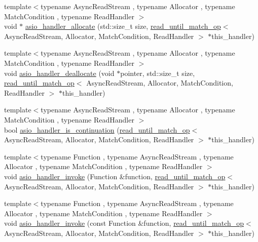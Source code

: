 \begin{DoxyCompactItemize}
\item 
{\footnotesize template$<$typename Async\+Read\+Stream , typename Allocator , typename Match\+Condition , typename Read\+Handler $>$ }\\void $\ast$ \hyperlink{namespaceasio_1_1detail_a5b22dd43113d0638c0d75b2701fc0d74}{asio\+\_\+handler\+\_\+allocate} (std\+::size\+\_\+t size, \hyperlink{classasio_1_1detail_1_1read__until__match__op}{read\+\_\+until\+\_\+match\+\_\+op}$<$ Async\+Read\+Stream, Allocator, Match\+Condition, Read\+Handler $>$ $\ast$this\+\_\+handler)
\item 
{\footnotesize template$<$typename Async\+Read\+Stream , typename Allocator , typename Match\+Condition , typename Read\+Handler $>$ }\\void \hyperlink{namespaceasio_1_1detail_a7ca75a364c4ff9e7eaa3bbabf5224dcf}{asio\+\_\+handler\+\_\+deallocate} (void $\ast$pointer, std\+::size\+\_\+t size, \hyperlink{classasio_1_1detail_1_1read__until__match__op}{read\+\_\+until\+\_\+match\+\_\+op}$<$ Async\+Read\+Stream, Allocator, Match\+Condition, Read\+Handler $>$ $\ast$this\+\_\+handler)
\item 
{\footnotesize template$<$typename Async\+Read\+Stream , typename Allocator , typename Match\+Condition , typename Read\+Handler $>$ }\\bool \hyperlink{namespaceasio_1_1detail_a98389902a59cc3cd55b50081154ab69b}{asio\+\_\+handler\+\_\+is\+\_\+continuation} (\hyperlink{classasio_1_1detail_1_1read__until__match__op}{read\+\_\+until\+\_\+match\+\_\+op}$<$ Async\+Read\+Stream, Allocator, Match\+Condition, Read\+Handler $>$ $\ast$this\+\_\+handler)
\item 
{\footnotesize template$<$typename Function , typename Async\+Read\+Stream , typename Allocator , typename Match\+Condition , typename Read\+Handler $>$ }\\void \hyperlink{namespaceasio_1_1detail_a76558fac22da9d48188a688157446174}{asio\+\_\+handler\+\_\+invoke} (Function \&function, \hyperlink{classasio_1_1detail_1_1read__until__match__op}{read\+\_\+until\+\_\+match\+\_\+op}$<$ Async\+Read\+Stream, Allocator, Match\+Condition, Read\+Handler $>$ $\ast$this\+\_\+handler)
\item 
{\footnotesize template$<$typename Function , typename Async\+Read\+Stream , typename Allocator , typename Match\+Condition , typename Read\+Handler $>$ }\\void \hyperlink{namespaceasio_1_1detail_aebe195e27dc9a4bd59c2e9c2ff6fa1ac}{asio\+\_\+handler\+\_\+invoke} (const Function \&function, \hyperlink{classasio_1_1detail_1_1read__until__match__op}{read\+\_\+until\+\_\+match\+\_\+op}$<$ Async\+Read\+Stream, Allocator, Match\+Condition, Read\+Handler $>$ $\ast$this\+\_\+handler)

\end{DoxyCompactItemize}
